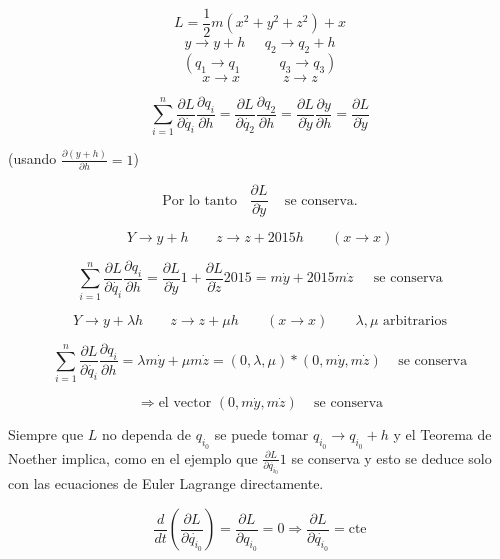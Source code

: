 \begin{example}

	$$L = \frac{1}{2} m (x^2 + y^2 + z^2) + x$$
	$$ y \rightarrow y + h \;\;\;\;\; q_2 \rightarrow q_2 + h $$
	$$ (q_1 \rightarrow q_1 \;\;\;\;\;\;\;\;\;\; q_3 \rightarrow q_3) $$
	$$x \rightarrow x \;\;\;\;\;\;\;\;\;\;\; z \rightarrow z$$

	$$ \sum_{i = 1}^n \frac{\partial L}{\partial \dot{q_i}} \frac{\partial q_i}{\partial h} =  \frac{\partial L}{\partial \dot{q_2}} \frac{\partial q_2}{\partial h} = \frac{\partial L}{\partial \dot{y}} \frac{\partial y}{\partial h} = \frac{\partial L}{\partial \dot{y}}$$

	(usando $\frac{\partial (y + h)}{\partial h} = 1$)

	$$ \text{Por lo tanto } \;\; \frac{\partial L}{\partial \dot{y}} \;\;\; \text{ se conserva}.$$

\end{example}

\begin{example}

	$$Y \rightarrow y + h \;\;\;\;\;\;\; z \rightarrow z + 2015 h \;\;\;\;\;\;\; (x \rightarrow x)$$

	$$\sum_{i = 1}^n \frac{\partial L}{\partial \dot{q_i}} \frac{\partial q_i}{\partial h} = \frac{\partial L}{\partial \dot{y}} 1 + \frac{\partial L}{\partial \dot{z}} 2015 = m \dot{y} + 2015 m \dot{z} \;\;\;\; \text{ se conserva}$$

\end{example}

\begin{example}


	$$Y \rightarrow y + \lambda h \;\;\;\;\;\;\; z \rightarrow z + \mu h \;\;\;\;\;\;\; (x \rightarrow x) \;\;\;\;\;\;\; \lambda, \mu \text{  arbitrarios}$$

	$$\sum_{i = 1}^n \frac{\partial L}{\partial \dot{q_i}} \frac{\partial q_i}{\partial h} = \lambda m \dot{y} + \mu m \dot{z} = (0, \lambda, \mu) * (0, m\dot{y}, m\dot{z}) \;\;\; \text{ se conserva}$$

	$$ \Rightarrow \text{el vector } (0, m\dot{y}, m\dot{z}) \;\;\; \text{ se conserva}$$ %

\end{example}

\begin{obs}

	Siempre que $L$ no dependa de $q_{i_0}$ se puede tomar $q_{i_0} \rightarrow q_{i_0} + h$ y el Teorema de Noether implica, como en el ejemplo que $\frac{\partial L}{\partial \dot{q_{i_0}}} 1$ se conserva y esto se deduce solo con las ecuaciones de Euler Lagrange directamente.

	$$ \frac{d}{dt} (\frac{\partial L}{\partial \dot{q_{i_0}}}) = \frac{\partial L}{\partial q_{i_0}} = 0 \Rightarrow \frac{\partial L}{\partial \dot{q_{i_0}}} = \text{cte}$$

\end{obs}

